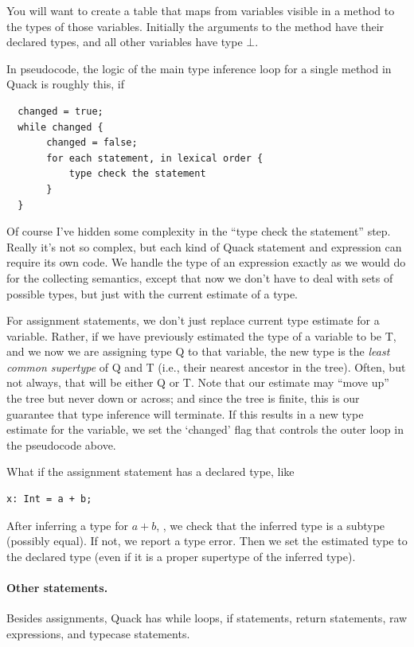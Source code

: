 \documentclass[11pt]{article}
\begin{document}
You will want to create a table that maps from variables visible in a
method to the types of those variables.  Initially the arguments to
the method have their declared types, and all other variables have
type $\bot$.   

In pseudocode, the logic of the main type inference loop for a single 
method in Quack is roughly this, if 
\begin{verbatim}
  changed = true;
  while changed {
       changed = false;
       for each statement, in lexical order {
           type check the statement
       }
  }
\end{verbatim}

Of course I've hidden some complexity in the ``type check the
statement'' step.  Really it's not so complex, but each kind of Quack
statement and expression can require its own code.  We handle the type
of an expression exactly as we would do for the collecting semantics,
except that now we don't have to deal with sets of possible types, but
just with the current estimate of a type.  

For assignment statements, we don't just replace current type estimate
for a variable.  Rather, if we have previously estimated the type of a
variable to be T, and we now we are assigning type Q to that variable,
the new type is the \emph{least common supertype} of Q and T (i.e.,
their nearest ancestor in the tree).  Often, but not always, that will
be either Q or T.  Note that our estimate may ``move up'' the tree but
never down or across; and since the tree is finite,   this is our
guarantee that type inference will 
terminate.   If this results in a new type estimate for the variable,
we set the `changed' flag that controls the outer loop in the
pseudocode above. 

What if the assignment statement has a declared type, like 
\begin{verbatim}
x: Int = a + b;
\end{verbatim}

After
inferring a type for $a+b$, , we check that the inferred type is a subtype
(possibly equal).  If not, we report a type error.   Then we set the
estimated type to the declared type (even if it is a proper supertype
of the inferred type).  

\paragraph{Other statements.}
Besides assignments, Quack has while loops, if statements, return
statements, raw expressions, and typecase statements. 
\end{document}
